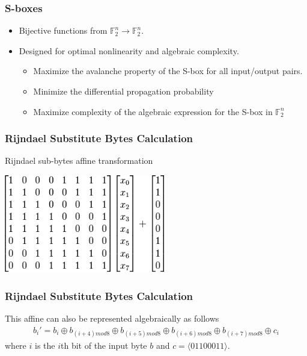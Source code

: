 \documentclass[handout]{beamer}
\newcommand{\field}[1]{\mathbb{#1}} %
\begin{document}
\begin{frame}
	\frametitle{S-boxes}
	\begin{itemize}
		\item Bijective functions from $\field{F}_2^n \to \field{F}_2^n$.
		\item Designed for optimal nonlinearity and algebraic complexity.
		\begin{itemize}
			\item Maximize the avalanche property of the S-box for all input/output pairs.
			\item Minimize the differential propagation probability %
			\item Maximize complexity of the algebraic expression for the S-box in $\field{F}_2^n$
		\end{itemize}
	\end{itemize}
\end{frame}

\begin{frame}
	\frametitle{Rijndael Substitute Bytes Calculation}
	Rijndael sub-bytes affine transformation
	\begin{center}
      		\includegraphics[width=70mm]{images/rijndael_sub_affine.png}
	\end{center}
\end{frame}

\begin{frame}
	\frametitle{Rijndael Substitute Bytes Calculation}
	This affine can also be represented algebraically as follows
	\begin{eqnarray*}
		b_i' = b_i \oplus b_{(i+4) mod 8} \oplus b_{(i+5) mod 8} \oplus b_{(i+6) mod 8} \oplus b_{(i+7) mod 8} \oplus c_i
	\end{eqnarray*}
	where $i$ is the $i$th bit of the input byte $b$ and $c = \langle 01100011 \rangle$.
\end{frame}
\end{document}
